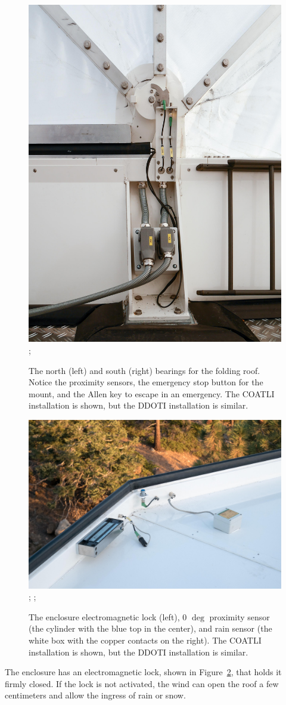 \begin{figure}
\begin{center}
{\begin{labeled}{\includegraphics[width=0.48\linewidth]{figures/enclosure-bearing-south.jpg}}
;
\end{labeled}}
\end{center}
\caption{The north (left) and south (right) bearings for the folding roof. Notice the proximity sensors, the emergency stop button for the mount, and the Allen key to escape in an emergency.
\ifddoti
The COATLI installation is shown, but the DDOTI installation is similar.
\fi
}
\label{figure:enclosure-bearing-north}
\label{figure:enclosure-beating-south}
\end{figure}


\begin{figure}
\begin{center}
\begin{labeled}{\includegraphics[width=0.8\linewidth]{figures/enclosure-electromagnetic-lock.jpg}}
;
;
\end{labeled}
\end{center}
\caption{The enclosure electromagnetic lock (left), 0 $\deg$ proximity sensor (the cylinder with the blue top in the center), and rain sensor (the white box with the copper contacts on the right).
\ifddoti
The COATLI installation is shown, but the DDOTI installation is similar.
\fi
}
\label{figure:enclosure-electromagnetic-lock}
\end{figure}

The enclosure has an electromagnetic lock, shown in Figure~\ref{figure:enclosure-electromagnetic-lock}, that holds it firmly closed. If the lock is not activated, the wind can open the roof a few centimeters and allow the ingress of rain or snow.

